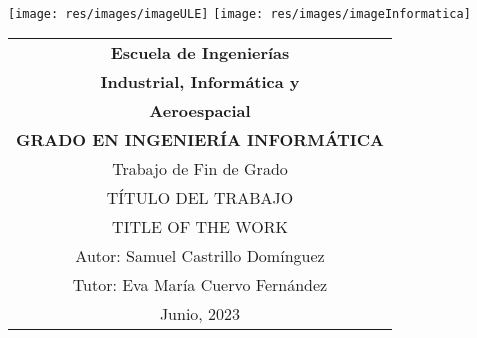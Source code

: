 \thispagestyle{empty}
\graphicspath{{./res/images/}}

\begin{table}[H]
	\centering

	\hfill
	\\[-15ex]
	\texttt{[image: res/images/imageULE]}
	\hfill
	\texttt{[image: res/images/imageInformatica]}
	\\[25ex]

	\label{tab:coverTopCenter}
	\begin{tabular}{c}
		\LARGE\textbf{Escuela de Ingenierías}
		\\[1.5ex]

		\LARGE\textbf{Industrial, Informática y}\\
		\LARGE\textbf{Aeroespacial}
		\\[2.3ex]

		\LARGE\textbf{GRADO EN INGENIERÍA INFORMÁTICA}
		\\[10ex]

		\LARGE{Trabajo de Fin de Grado}
		\\[10ex]

		\LARGE{\uppercase{Título del trabajo}}
		\\[5ex]

		\LARGE{\uppercase{Title of the work}}
		\\[22ex]

		\hfill\large{Autor: Samuel Castrillo Domínguez}
		\\[3pt]
		\hfill\large{Tutor: Eva María Cuervo Fernández}
		\\[10ex]

		\huge{Junio, 2023}
	\end{tabular}
\end{table}
